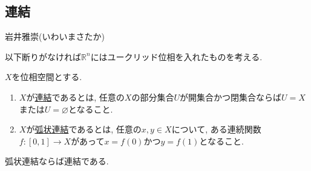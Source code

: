 \documentclass[dvipdfmx,a4paper,11pt]{article}
\newcommand{\R}{\mathbb{R}}
\theoremstyle{definition}
\begin{document}
\newpage

\begin{center}
\section{連結}
\label{sec-connected}
\end{center}

\begin{flushright}
 岩井雅崇(いわいまさたか)
\end{flushright}

以下断りがなければ$\R^{n}$にはユークリッド位相を入れたものを考える. 
 \begin{tcolorbox}[
   colback = white,
   colframe = green!35!black,
    fonttitle = \bfseries,
    breakable = true]
        $X$を位相空間とする.
    \begin{enumerate}
    \setlength{\parskip}{0cm} 
  \setlength{\itemsep}{0pt} 
    \item $X$が\underline{連結}であるとは, 任意の$X$の部分集合$U$が開集合かつ閉集合ならば$U = X$または$U = \varnothing$となること.
\item $X$が\underline{弧状連結}であるとは, 任意の$x,y \in X$について, ある連続関数$f : [0,1] \rightarrow X$があって$x = f(0)$かつ$y=f(1)$となること.
\end{enumerate}
弧状連結ならば連結である.
 \end{tcolorbox}
\end{document}

